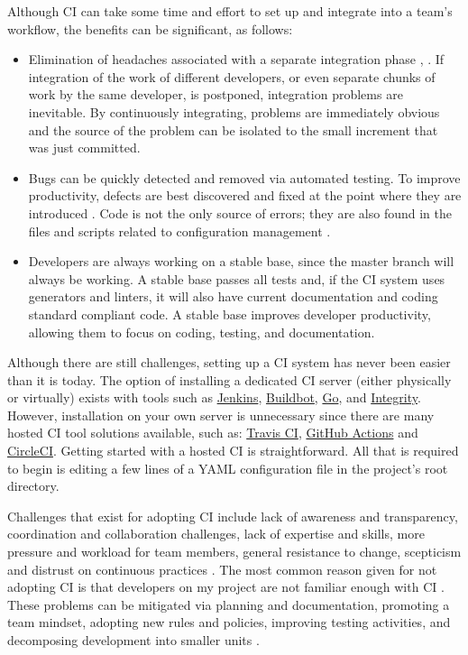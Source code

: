 \documentclass[final, 3p, times, authoryear]{elsarticle}
\begin{document}
Although CI can take some time and effort to set up and integrate into a team's
workflow, the benefits can be significant, as follows:

\begin{itemize}
	\item Elimination of headaches associated with a separate integration phase
	\citep{Fowler2006}, \citep[p.\ 20]{HumbleAndFarley2010}. If integration of
	the work of different developers, or even separate chunks of work by the
	same developer, is postponed, integration problems are inevitable.  By
	continuously integrating, problems are immediately obvious and the source of
	the problem can be isolated to the small increment that was just committed.
	\item Bugs can be quickly detected and removed \citep{Fowler2006} via
	automated testing.  To improve productivity, defects are best discovered and
	fixed at the point where they are introduced \citep[p.\
	23]{HumbleAndFarley2010}.  Code is not the only source of errors; they are
	also found in the files and scripts related to configuration management
	\citep[p.\ 18]{HumbleAndFarley2010}.
	\item Developers are always working on a stable base, since the master
	branch will always be working.  A stable base passes all tests and, if the
	CI system uses generators and linters, it will also have current
	documentation and coding standard compliant code.  A stable base improves
	developer productivity, allowing them to focus on coding, testing, and
	documentation.
\end{itemize}

Although there are still challenges, setting up a CI system has never been
easier than it is today.  The option of installing a dedicated CI server (either
physically or virtually) exists with tools such as
\href{https://www.jenkins.io/} {Jenkins}, \href{http://buildbot.net/}
{Buildbot}, \href{https://www.gocd.org/} {Go}, and
\href{http://integrity.github.io/} {Integrity}. However, installation on your
own server is unnecessary since there are many hosted CI tool solutions
available, such as: \href{https://travis-ci.org/} {Travis CI},
\href{https://github.com/features/actions} {GitHub Actions} and
\href{https://circleci.com/} {CircleCI}.  Getting started with a hosted CI is
straightforward.  All that is required to begin is editing a few lines of a YAML
configuration file in the project's root directory.

Challenges that exist for adopting CI include lack of awareness and
transparency, coordination and collaboration challenges, lack of expertise and
skills, more pressure and workload for team members, general resistance to
change, scepticism and distrust on continuous practices \citep{ShahinEtAl2017}.
The most common reason given for not adopting CI is that developers on my
project are not familiar enough with CI \citep{HiltonEtAl2016}.  These problems
can be mitigated via planning and documentation, promoting a team mindset,
adopting new rules and policies, improving testing activities, and decomposing
development into smaller units \citep{ShahinEtAl2017}.
\end{document}

